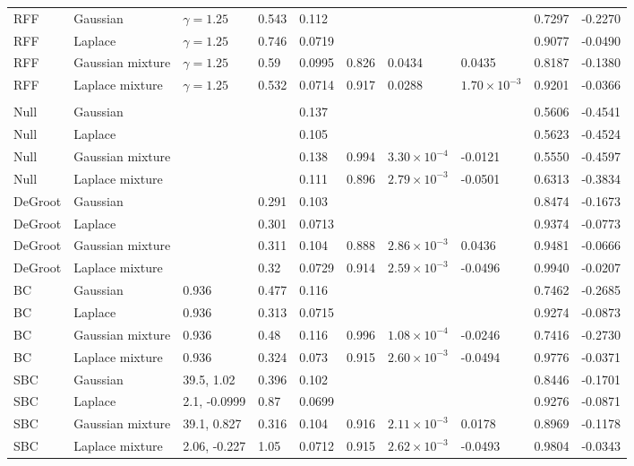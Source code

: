 \begin{longtable}{llllllllrr}
RFF & Gaussian & $\gamma=1.25$ & 0.543 & 0.112 &  &  &  & 0.7297 & -0.2270 \\
RFF & Laplace & $\gamma=1.25$ & 0.746 & 0.0719 &  &  &  & 0.9077 & -0.0490 \\
RFF & Gaussian mixture & $\gamma=1.25$ & 0.59 & 0.0995 & 0.826 & 0.0434 & 0.0435 & 0.8187 & -0.1380 \\
RFF & Laplace mixture & $\gamma=1.25$ & 0.532 & 0.0714 & 0.917 & 0.0288 & $1.70\times10^{-3}$ & 0.9201 & -0.0366 \\
\midrule
\multicolumn{10}{l}{\takacsInt{}} \\
Null & Gaussian &  &  & 0.137 &  &  &  & 0.5606 & -0.4541 \\
Null & Laplace &  &  & 0.105 &  &  &  & 0.5623 & -0.4524 \\
Null & Gaussian mixture &  &  & 0.138 & 0.994 & $3.30\times10^{-4}$ & -0.0121 & 0.5550 & -0.4597 \\
Null & Laplace mixture &  &  & 0.111 & 0.896 & $2.79\times10^{-3}$ & -0.0501 & 0.6313 & -0.3834 \\
DeGroot & Gaussian &  & 0.291 & 0.103 &  &  &  & 0.8474 & -0.1673 \\
DeGroot & Laplace &  & 0.301 & 0.0713 &  &  &  & 0.9374 & -0.0773 \\
DeGroot & Gaussian mixture &  & 0.311 & 0.104 & 0.888 & $2.86\times10^{-3}$ & 0.0436 & 0.9481 & -0.0666 \\
DeGroot & Laplace mixture &  & 0.32 & 0.0729 & 0.914 & $2.59\times10^{-3}$ & -0.0496 & 0.9940 & -0.0207 \\
BC & Gaussian & 0.936 & 0.477 & 0.116 &  &  &  & 0.7462 & -0.2685 \\
BC & Laplace & 0.936 & 0.313 & 0.0715 &  &  &  & 0.9274 & -0.0873 \\
BC & Gaussian mixture & 0.936 & 0.48 & 0.116 & 0.996 & $1.08\times10^{-4}$ & -0.0246 & 0.7416 & -0.2730 \\
BC & Laplace mixture & 0.936 & 0.324 & 0.073 & 0.915 & $2.60\times10^{-3}$ & -0.0494 & 0.9776 & -0.0371 \\
SBC & Gaussian & 39.5, 1.02 & 0.396 & 0.102 &  &  &  & 0.8446 & -0.1701 \\
SBC & Laplace & 2.1, -0.0999 & 0.87 & 0.0699 &  &  &  & 0.9276 & -0.0871 \\
SBC & Gaussian mixture & 39.1, 0.827 & 0.316 & 0.104 & 0.916 & $2.11\times10^{-3}$ & 0.0178 & 0.8969 & -0.1178 \\
SBC & Laplace mixture & 2.06, -0.227 & 1.05 & 0.0712 & 0.915 & $2.62\times10^{-3}$ & -0.0493 & 0.9804 & -0.0343 \\

\end{longtable}
